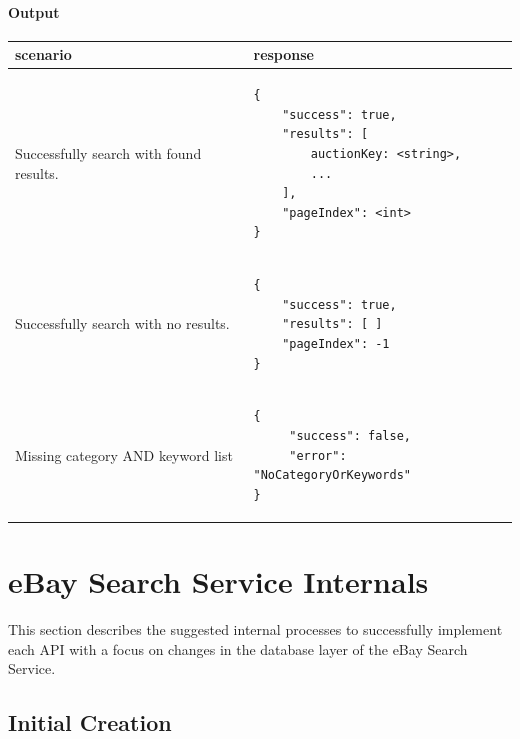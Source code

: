\documentclass[12pt,a4paper]{article}
\begin{document}
\paragraph{Output}
\begin{center}
    \begin{tabular}{| p{7cm} | l |}
        \hline
        \textbf{scenario} & \textbf{response} \\
        \hline
        Successfully search with found results. &
        \begin{lstlisting}[language=tablejson,firstnumber=1]
{
    "success": true,
    "results": [ 
        auctionKey: <string>,
        ...
    ],
    "pageIndex": <int>
}
        \end{lstlisting} \\ 
        \hline
        Successfully search with no results. &
        \begin{lstlisting}[language=tablejson,firstnumber=1]
{
    "success": true,
    "results": [ ]
    "pageIndex": -1
}
         \end{lstlisting} \\ 
         \hline
         Missing category AND keyword list &
         \begin{lstlisting}[language=tablejson,firstnumber=1]
{
     "success": false,
     "error": "NoCategoryOrKeywords"
}
          \end{lstlisting} \\ 
          \hline
    \end{tabular}
\end{center}

\pagebreak
\section{eBay Search Service Internals}

This section describes the suggested internal processes to successfully implement each API with a focus on changes in the database layer of the eBay Search Service.


\subsection{Initial Creation}
\end{document}
